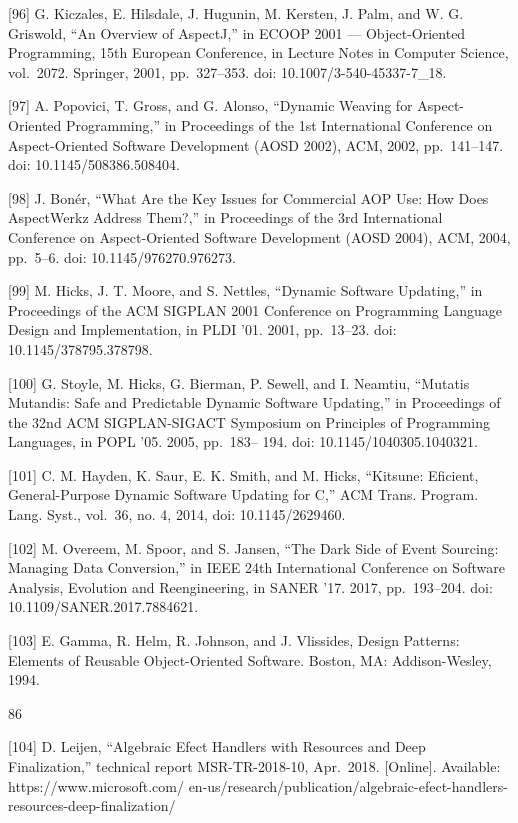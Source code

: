 \documentclass[
  10
]{article}
\begin{document}
{[}96{]} G. Kiczales, E. Hilsdale, J. Hugunin, M. Kersten, J. Palm, and
W. G. Griswold, ``An Overview of AspectJ,'' in ECOOP 2001 ---
Object-Oriented Programming, 15th European Conference, in Lecture Notes
in Computer Science, vol.~2072. Springer, 2001, pp.~327--353. doi:
10.1007/3-540-45337-7\_18.

{[}97{]} A. Popovici, T. Gross, and G. Alonso, ``Dynamic Weaving for
Aspect-Oriented Programming,'' in Proceedings of the 1st International
Conference on Aspect-Oriented Software Development (AOSD 2002), ACM,
2002, pp.~141--147. doi: 10.1145/508386.508404.

{[}98{]} J. Bonér, ``What Are the Key Issues for Commercial AOP Use: How
Does AspectWerkz Address Them?,'' in Proceedings of the 3rd
International Conference on Aspect-Oriented Software Development (AOSD
2004), ACM, 2004, pp.~5--6. doi: 10.1145/976270.976273.

{[}99{]} M. Hicks, J. T. Moore, and S. Nettles, ``Dynamic Software
Updating,'' in Proceedings of the ACM SIGPLAN 2001 Conference on
Programming Language Design and Implementation, in PLDI '01. 2001,
pp.~13--23. doi: 10.1145/378795.378798.

{[}100{]} G. Stoyle, M. Hicks, G. Bierman, P. Sewell, and I. Neamtiu,
``Mutatis Mutandis: Safe and Predictable Dynamic Software Updating,'' in
Proceedings of the 32nd ACM SIGPLAN-SIGACT Symposium on Principles of
Programming Languages, in POPL '05. 2005, pp.~183-- 194. doi:
10.1145/1040305.1040321.

{[}101{]} C. M. Hayden, K. Saur, E. K. Smith, and M. Hicks, ``Kitsune:
Eficient, General-Purpose Dynamic Software Updating for C,'' ACM Trans.
Program. Lang. Syst., vol.~36, no. 4, 2014, doi: 10.1145/2629460.

{[}102{]} M. Overeem, M. Spoor, and S. Jansen, ``The Dark Side of Event
Sourcing: Managing Data Conversion,'' in IEEE 24th International
Conference on Software Analysis, Evolution and Reengineering, in SANER
'17. 2017, pp.~193--204. doi: 10.1109/SANER.2017.7884621.

{[}103{]} E. Gamma, R. Helm, R. Johnson, and J. Vlissides, Design
Patterns: Elements of Reusable Object-Oriented Software. Boston, MA:
Addison-Wesley, 1994.

86

{[}104{]} D. Leijen, ``Algebraic Efect Handlers with Resources and Deep
Finalization,'' technical report MSR-TR-2018-10, Apr.~2018.
{[}Online{]}. Available: https://www.microsoft.com/
en-us/research/publication/algebraic-efect-handlers-resources-deep-finalization/
\end{document}

